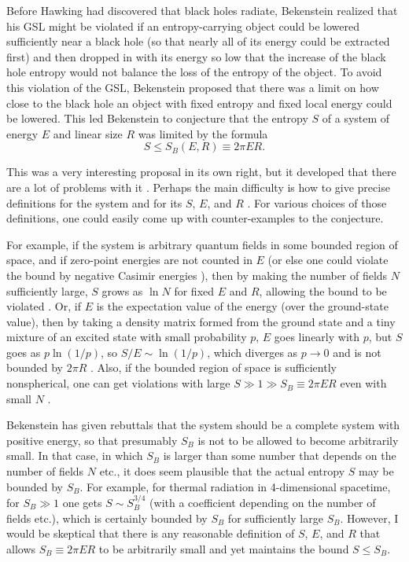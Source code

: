 \documentclass[12pt]{article} \usepackage{latexsym}
\begin{document}
Before Hawking had discovered that black holes radiate, Bekenstein
\cite{Bek3,Bek4} realized that his GSL might be violated if an
entropy-carrying object could be lowered sufficiently near a black
hole (so that nearly all of its energy could be extracted first) and
then dropped in with its energy so low that the increase of the black
hole entropy would not balance the loss of the entropy of the object.
To avoid this violation of the GSL, Bekenstein proposed that there was
a limit on how close to the black hole an object with fixed entropy
and fixed local energy could be lowered.  This led Bekenstein to
conjecture \cite{Bek5} that the entropy $S$ of a system of energy $E$
and linear size $R$ was limited by the formula
 \begin{equation}
 S \le S_B(E,R) \equiv 2\pi ER.
 \label{eq:19}
 \end{equation}

This was a very interesting proposal in its own right, but it
developed that there are a lot of problems with it
\cite{Unwin,Page82,UW,Deutsch,UW2,Zas,PW,Page00a,Page00b,Page00c,MS}.
Perhaps the main difficulty is how to give precise definitions for the
system and for its $S$, $E$, and $R$ \cite{Page00c}.  For various
choices of those definitions, one could easily come up with
counter-examples to the conjecture.

For example, if the system is arbitrary quantum fields in some bounded
region of space, and if zero-point energies are not counted in $E$ (or
else one could violate the bound by negative Casimir energies
\cite{Unwin}), then by making the number of fields $N$ sufficiently
large, $S$ grows as $\ln{N}$ for fixed $E$ and $R$, allowing the bound
to be violated \cite{Page82,UW}.  Or, if $E$ is the expectation value
of the energy (over the ground-state value), then by taking a density
matrix formed from the ground state and a tiny mixture of an excited
state with small probability $p$, $E$ goes linearly with $p$, but $S$
goes as $p\ln{(1/p)}$, so $S/E \sim \ln{(1/p)}$, which diverges as $p
\rightarrow 0$ and is not bounded by $2\pi R$
\cite{Deutsch,Page00a,Page00b,Page00c}.  Also, if the bounded region
of space is sufficiently nonspherical, one can get violations with
large $S \gg 1 \gg S_B \equiv 2\pi ER$ even with small $N$
\cite{Page00a,Page00b}.

Bekenstein has given rebuttals \cite{Bek6,Bek7,Bek8,Bek9,Bek10} that
the system should be a complete system with positive energy, so that
presumably $S_B$ is not to be allowed to become arbitrarily small.  In
that case, in which $S_B$ is larger than some number that depends on
the number of fields $N$ etc., it does seem plausible that the actual
entropy $S$ may be bounded by $S_B$.  For example, for thermal
radiation in 4-dimensional spacetime, for $S_B \gg 1$ one gets $S \sim
S_B^{3/4}$ (with a coefficient depending on the number of fields
etc.), which is certainly bounded by $S_B$ for sufficiently large
$S_B$.  However, I would be skeptical that there is any reasonable
definition of $S$, $E$, and $R$ that allows $S_B \equiv 2\pi ER$ to be
arbitrarily small and yet maintains the bound $S \le S_B$.
\end{document}
